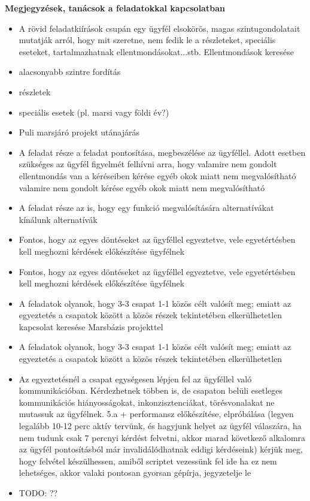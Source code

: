 \documentclass[12pt]{report}
\begin{document}
\textbf{Megjegyzések, tanácsok a feladatokkal kapcsolatban} 
\begin{itemize}
    \item A rövid feladatkiírások csupán egy ügyfél elsokörös, magas szintugondolatait mutatják arról, hogy mit szeretne, nem fedik le a részleteket, speciális eseteket, tartalmazhatnak ellentmondásokat...stb.
    Ellentmondások keresése
    \item alacsonyabb szintre fordítás
    \item részletek
    \item speciális esetek (pl. marsi vagy földi év?)
    \item Puli marsjáró projekt utánajárás
    \item A feladat része a feladat pontosítása, megbeszélése az ügyféllel. Adott esetben szükséges az ügyfél figyelmét felhívni arra, hogy valamire nem gondolt  ellentmondás van a kéréseiben  kérése egyéb okok miatt nem megvalósítható    
    valamire nem gondolt kérése egyéb okok miatt nem megvalósítható
    \item A feladat része az is, hogy egy funkció megvalósítására alternatívákat kínálunk    
    alternatívák
    \item Fontos, hogy az egyes döntéseket az ügyféllel egyeztetve, vele egyetértésben kell meghozni
    kérdések előkészítése ügyfélnek
    \item Fontos, hogy az egyes döntéseket az ügyféllel egyeztetve, vele egyetértésben kell meghozni
    kérdések előkészítése ügyfélnek
    \item A feladatok olyanok, hogy 3-3 csapat 1-1 közös célt valósít meg; emiatt az egyeztetés a csapatok között a közös részek tekintetében elkerülhetetlen
    kapcsolat keresése Marsbázis projekttel
    \item A feladatok olyanok, hogy 3-3 csapat 1-1 közös célt valósít meg; emiatt az egyeztetés a csapatok között a közös részek tekintetében elkerülhetetlen
    \item Az egyeztetésnél a csapat egységesen lépjen fel az ügyféllel való kommunikációban. Kérdezhetnek többen is, de csapaton belüli esetleges kommunikációs hiányosságokat, inkonzisztenciákat, törésvonalakat ne mutassuk az ügyfélnek.
    5.a + performansz előkészítése, elpróbálása (legyen legalább 10-12 perc aktív tervünk, és hagyjunk helyet az ügyfél válaszára, ha nem tudunk csak 7 percnyi kérdést felvetni, akkor marad következő alkalomra  az ügyfél pontosításból már invalidálódhatnak eddigi kérdéseink)
    kérjük meg, hogy felvétel készülhessen, amiből scriptet vezessünk fel ide
    ha ez nem lehetséges, akkor valaki pontosan gyorsan gépírja, jegyzetelje le
    \item TODO: ??

\end{itemize}                  
\end{document}
